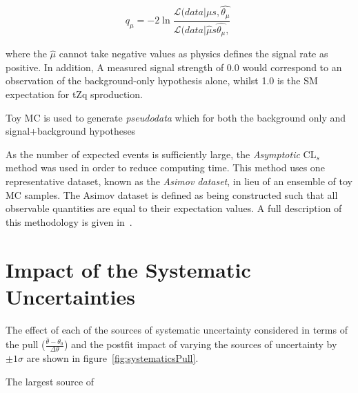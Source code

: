 \begin{equation}
 q_{\mu} =  -2 \ln \frac{ \mathcal{L}(data | \mu s , \hat{\theta_{\mu}}}{ \mathcal{L}(data | \hat{\mu} s \hat{\theta_{\mu}},  } \;
\label{eq:testStatistic}
\end{equation}



where the
$\hat{\mu}$ 
cannot take negative values as physics defines the signal rate as positive.
In addition, 
A measured signal strength of 0.0 would correspond to an observation of the background-only hypothesis alone, whilst 1.0 is the SM expectation for tZq sproduction.


Toy MC is used to generate \emph{pseudodata} which for both the background only and signal+background hypotheses 

As the number of expected events is sufficiently large, the \emph{Asymptotic} CL$_{s}$ method was used in order to reduce computing time.
This method uses one representative dataset, known as the \emph{Asimov dataset}, in lieu of an ensemble of toy MC samples.
The Asimov dataset is defined as being constructed such that all observable quantities are equal to their expectation values.
A full description of this methodology is given in~\cite{Cowan:2010js}.

\section{Impact of the Systematic Uncertainties}\label{sec:uncertainitiesImpact}
The effect of each of the sources of systematic uncertainty considered in terms of the pull ($\frac{ \hat{\theta} - \theta_{0} }{\Delta \theta}$) and the postfit impact of varying the sources of uncertainty by $\pm 1 \sigma$ are shown in figure~\ref{fig:systematicsPull}.

The largest source of 


